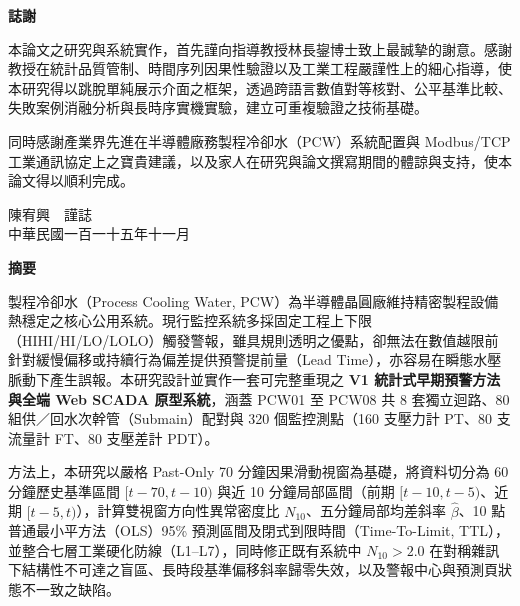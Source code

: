 \documentclass[fontset=none, a4paper, 12pt]{ctexart}
\begin{document}
\clearpage
{}
\pagestyle{empty}
\begin{center}
    \large\bfseries 誌謝
\end{center}
\vspace{0.5em}

本論文之研究與系統實作，首先謹向指導教授林長鋆博士致上最誠摯的謝意。感謝教授在統計品質管制、時間序列因果性驗證以及工業工程嚴謹性上的細心指導，使本研究得以跳脫單純展示介面之框架，透過跨語言數值對等核對、公平基準比較、失敗案例消融分析與長時序實機實驗，建立可重複驗證之技術基礎。

同時感謝產業界先進在半導體廠務製程冷卻水（PCW）系統配置與 Modbus/TCP 工業通訊協定上之寶貴建議，以及家人在研究與論文撰寫期間的體諒與支持，使本論文得以順利完成。

\vspace{2em}
\begin{flushright}
陳宥興　謹誌\\
中華民國一百一十五年十一月
\end{flushright}

\clearpage
\pagestyle{plain}
\setcounter{page}{1}

{}
\begin{center}
\large\bfseries 摘要
\end{center}
\vspace{0.5em}

製程冷卻水（Process Cooling Water, PCW）為半導體晶圓廠維持精密製程設備熱穩定之核心公用系統。現行監控系統多採固定工程上下限（HIHI/HI/LO/LOLO）觸發警報，雖具規則透明之優點，卻無法在數值越限前針對緩慢偏移或持續行為偏差提供預警提前量（Lead Time），亦容易在瞬態水壓脈動下產生誤報。本研究設計並實作一套可完整重現之 \textbf{V1 統計式早期預警方法與全端 Web SCADA 原型系統}，涵蓋 PCW01 至 PCW08 共 8 套獨立迴路、80 組供／回水次幹管（Submain）配對與 320 個監控測點（160 支壓力計 PT、80 支流量計 FT、80 支壓差計 PDT）。

方法上，本研究以嚴格 Past-Only 70 分鐘因果滑動視窗為基礎，將資料切分為 60 分鐘歷史基準區間 $[t-70, t-10)$ 與近 10 分鐘局部區間（前期 $[t-10, t-5)$、近期 $[t-5, t)$），計算雙視窗方向性異常密度比 $N_{10}$、五分鐘局部均差斜率 $\hat{\beta}$、10 點普通最小平方法（OLS）95\% 預測區間及閉式到限時間（Time-To-Limit, TTL），並整合七層工業硬化防線（L1–L7），同時修正既有系統中 $N_{10} > 2.0$ 在對稱雜訊下結構性不可達之盲區、長時段基準偏移斜率歸零失效，以及警報中心與預測頁狀態不一致之缺陷。
\end{document}
